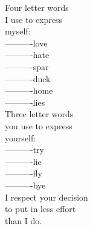 Four letter words\\
I use to express\\
myself:\\
----------love\\
----------hate\\
----------spar\\
----------duck\\
----------home\\
----------lies\\

Three letter words\\
you use to express\\
yourself:\\
----------try\\
----------lie\\
----------fly\\
----------bye\\

I respect your decision\\
to put in less effort\\
than I do.\\

